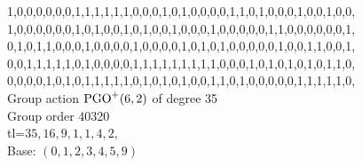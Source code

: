 1,0,0,0,0,0,0,1,1,1,1,1,1,0,0,0,1,0,1,0,0,0,0,1,1,0,1,0,0,0,1,0,0,1,0,0,\\
1,0,0,0,0,0,0,1,0,1,0,0,1,0,1,0,0,1,0,0,0,1,0,0,0,0,0,1,1,0,0,0,0,0,0,1,\\
0,1,0,1,1,0,0,0,1,0,0,0,0,1,0,0,0,0,1,0,1,0,1,0,0,0,0,0,1,0,0,1,1,0,0,1,\\
0,0,1,1,1,1,1,0,1,0,0,0,0,1,1,1,1,1,1,1,1,1,0,0,0,1,0,1,0,1,0,1,0,1,1,0,\\
0,0,0,0,1,0,1,0,1,1,1,1,1,0,1,0,1,0,1,0,0,1,1,0,1,0,0,0,0,0,1,1,1,1,1,0,\\
Group action ${\rm PGO}^{+}(6,2)$ of degree 35\\
Group order 40320\\
tl=$35, 16, 9, 1, 1, 4, 2, $\\
Base: $( 0, 1, 2, 3, 4, 5, 9 )$\\
